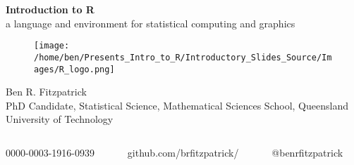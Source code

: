 \documentclass[xcolor=dvipsnames]{beamer}
\begin{document}
\begin{frame} %
\textbf{\huge Introduction to R}\\
a language and environment for statistical computing and graphics %

\begin{figure}
\texttt{[image: /home/ben/Presents\_Intro\_to\_R/Introductory\_Slides\_Source/Images/R\_logo.png]}
\end{figure}
\small Ben R. Fitzpatrick\\
\tiny PhD Candidate, Statistical Science, Mathematical Sciences School, Queensland University of Technology
\newline
\begin{columns}
\begin{column}{3cm}
\tiny 0000-0003-1916-0939
\end{column}
\begin{column}{3cm}
\tiny github.com/brfitzpatrick/
\end{column}
\begin{column}{3cm}
\tiny @benrfitzpatrick
\end{column}
\end{columns}
\end{frame}
\end{document}

